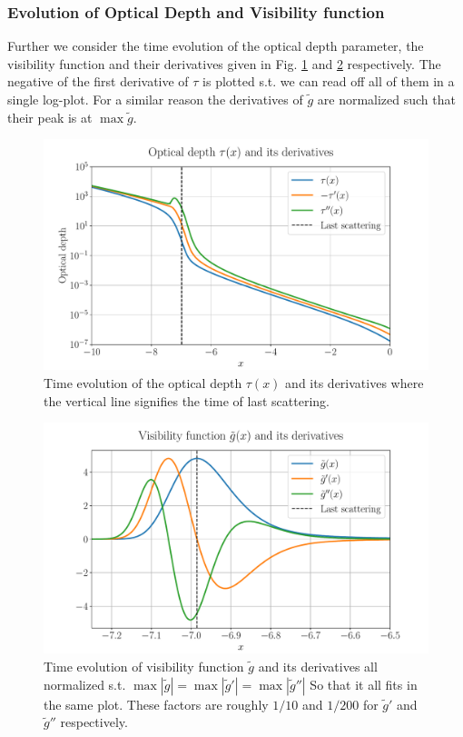 \documentclass[%
reprint,
 amsmath,amssymb,
 aps,
]{revtex4-2}
\begin{document}
\subsubsection{Evolution of Optical Depth and Visibility function}
Further we consider the time evolution of the optical depth parameter, the visibility function and their derivatives given in Fig. \ref{fig:tau} and \ref{fig:gtilde} respectively. The negative of the first derivative of $\tau$ is plotted s.t. we can read off all of them in a single log-plot. For a similar reason the derivatives of $\tilde g$ are normalized such that their peak is at $\max\tilde g$. 
\begin{figure}[ht!]
	\includegraphics[width = \linewidth]{Figures/tau_and_derivs.pdf}
	\caption{Time evolution of the optical depth $\tau(x)$ and its derivatives where the vertical line signifies the time of last scattering.}
	\label{fig:tau}
\end{figure}
\begin{figure}[ht!]
	\includegraphics[width = \linewidth]{Figures/gtilde.pdf}
	\caption{Time evolution of visibility function $\tilde g$ and its derivatives all normalized s.t. $\max|\tilde g|=\max|\tilde g'|=\max|\tilde g''|$ So that it all fits in the same plot. These factors are roughly $1/10$ and $1/200$ for $\tilde g'$ and $\tilde g''$ respectively.}
	\label{fig:gtilde}
\end{figure}
\end{document}
